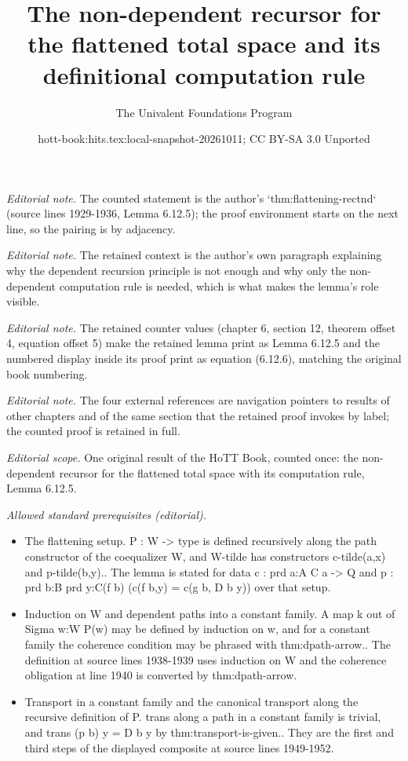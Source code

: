 \documentclass[10pt,a4paper]{article}
\title{The non-dependent recursor for the flattened total space and its definitional computation rule}
\author{The Univalent Foundations Program}
\date{hott-book:hits.tex:local-snapshot-20261011; CC BY-SA 3.0 Unported}
\newcounter{chapter}
\theoremstyle{definition}
\theoremstyle{remark}
\numberwithin{equation}{section}
\begin{document}
\maketitle
\setcounter{chapter}{6}
\setcounter{section}{12}
\setcounter{thm}{4}
\setcounter{equation}{5}
\noindent\textit{Editorial note.} The counted statement is the author's `thm:flattening-rectnd` (source lines 1929-1936, Lemma 6.12.5); the proof environment starts on the next line, so the pairing is by adjacency.\par\medskip
\noindent\textit{Editorial note.} The retained context is the author's own paragraph explaining why the dependent recursion principle is not enough and why only the non-dependent computation rule is needed, which is what makes the lemma's role visible.\par\medskip
\noindent\textit{Editorial note.} The retained counter values (chapter 6, section 12, theorem offset 4, equation offset 5) make the retained lemma print as Lemma 6.12.5 and the numbered display inside its proof print as equation (6.12.6), matching the original book numbering.\par\medskip
\noindent\textit{Editorial note.} The four external references are navigation pointers to results of other chapters and of the same section that the retained proof invokes by label; the counted proof is retained in full.\par\medskip
\noindent\textit{Editorial scope.} One original result of the HoTT Book, counted once: the non-dependent recursor for the flattened total space with its computation rule, Lemma 6.12.5.\par\medskip
\noindent\textit{Allowed standard prerequisites (editorial).}\begin{itemize}
\item The flattening setup. P : W -> type is defined recursively along the path constructor of the coequalizer W, and W-tilde has constructors c-tilde(a,x) and p-tilde(b,y).. The lemma is stated for data c : prd a:A C a -> Q and p : prd b:B prd y:C(f b) (c(f b,y) = c(g b, D b y)) over that setup.
\item Induction on W and dependent paths into a constant family. A map k out of Sigma w:W P(w) may be defined by induction on w, and for a constant family the coherence condition may be phrased with thm:dpath-arrow.. The definition at source lines 1938-1939 uses induction on W and the coherence obligation at line 1940 is converted by thm:dpath-arrow.
\item Transport in a constant family and the canonical transport along the recursive definition of P. trans along a path in a constant family is trivial, and trans (p b) y = D b y by thm:transport-is-given.. They are the first and third steps of the displayed composite at source lines 1949-1952.
\end{itemize}\medskip
\end{document}
